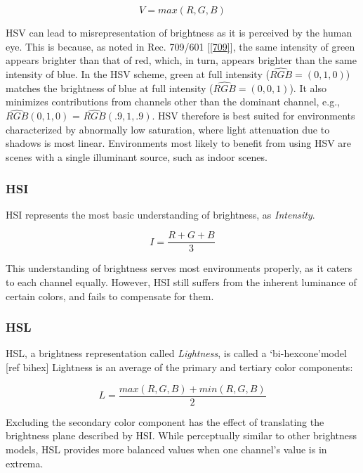 \begin{equation}
V = max(R, G, B)
\label{eqn:hsv}
\end{equation}

HSV can lead to misrepresentation of brightness as it is perceived by the human eye. This is because, as noted in Rec. 709/601 [\ref{709}], the same intensity of green appears brighter than that of red, which, in turn, appears brighter than the same intensity of blue. In the HSV scheme, green at full intensity ($\hat{RGB} = (0, 1, 0)$) matches the brightness of blue at full intensity ($\hat{RGB} = (0, 0, 1)$). It also minimizes contributions from channels other than the dominant channel, e.g., $\hat{RGB}(0, 1, 0)$ = $\hat{RGB}(.9, 1, .9)$. HSV therefore is best suited for environments characterized by abnormally low saturation, where light attenuation due to shadows is most linear. Environments most likely to benefit from using HSV are scenes with a single illuminant source, such as indoor scenes.

\subsubsection{HSI}

HSI represents the most basic understanding of brightness, as \textit{Intensity}. 

\begin{equation}
I = \dfrac{R + G + B}{3}
\end{equation}

This understanding of brightness serves most environments properly, as it caters to each channel equally. However, HSI still suffers from the inherent luminance of certain colors, and fails to compensate for them.

\subsubsection{HSL}

HSL, a brightness representation called \textit{Lightness}, is called a \lq{bi-hexcone}\rq model [ref bihex] Lightness is an average of the primary and tertiary color components:

\begin{equation}
L = \dfrac{max(R,G,B) + min(R,G,B)}{2}
\end{equation}

Excluding the secondary color component has the effect of translating the brightness plane described by HSI. While perceptually similar to other brightness models, HSL provides more balanced values when one channel's value is in extrema.


